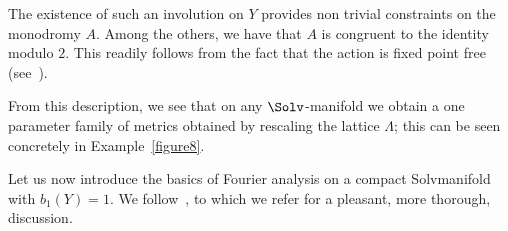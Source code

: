 \begin{rema}\label{mod2}
The existence of such an involution on $Y$ provides non trivial constraints on the monodromy $A$. Among the others, we have that $A$ is congruent to the identity modulo $2$. This readily follows from the fact that the action is fixed point free (see~\cite[Section~6]{Sak}).
\end{rema}

From this description, we see that on any $\Solv$-manifold we obtain a one parameter family of metrics obtained by rescaling the lattice $\Lambda$; this can be seen concretely in Example~\ref{figure8}.


Let us now introduce the basics of Fourier analysis on a compact Solvmanifold with $b_1(Y)=1$. We follow~\cite[the first chapter]{Bre}, to which we refer for a pleasant, more thorough, discussion.


